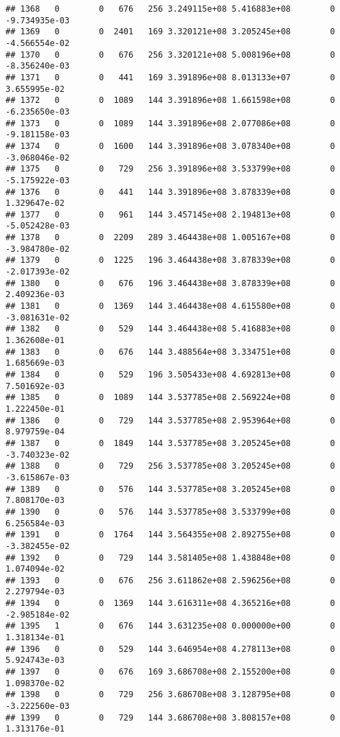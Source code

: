 \documentclass[
]{article}
\begin{document}
\begin{enumerate}
\begin{verbatim}
## 1368   0        0   676   256 3.249115e+08 5.416883e+08        0 -9.734935e-03
## 1369   0        0  2401   169 3.320121e+08 3.205245e+08        0 -4.566554e-02
## 1370   0        0   676   256 3.320121e+08 5.008196e+08        0 -8.356240e-03
## 1371   0        0   441   169 3.391896e+08 8.013133e+07        0  3.655995e-02
## 1372   0        0  1089   144 3.391896e+08 1.661598e+08        0 -6.235650e-03
## 1373   0        0  1089   144 3.391896e+08 2.077086e+08        0 -9.181158e-03
## 1374   0        0  1600   144 3.391896e+08 3.078340e+08        0 -3.068046e-02
## 1375   0        0   729   256 3.391896e+08 3.533799e+08        0 -5.175922e-03
## 1376   0        0   441   144 3.391896e+08 3.878339e+08        0  1.329647e-02
## 1377   0        0   961   144 3.457145e+08 2.194813e+08        0 -5.052428e-03
## 1378   0        0  2209   289 3.464438e+08 1.005167e+08        0 -3.984780e-02
## 1379   0        0  1225   196 3.464438e+08 3.878339e+08        0 -2.017393e-02
## 1380   0        0   676   196 3.464438e+08 3.878339e+08        0  2.409236e-03
## 1381   0        0  1369   144 3.464438e+08 4.615580e+08        0 -3.081631e-02
## 1382   0        0   529   144 3.464438e+08 5.416883e+08        0  1.362608e-01
## 1383   0        0   676   144 3.488564e+08 3.334751e+08        0  1.685669e-03
## 1384   0        0   529   196 3.505433e+08 4.692813e+08        0  7.501692e-03
## 1385   0        0  1089   144 3.537785e+08 2.569224e+08        0  1.222450e-01
## 1386   0        0   729   144 3.537785e+08 2.953964e+08        0  8.979759e-04
## 1387   0        0  1849   144 3.537785e+08 3.205245e+08        0 -3.740323e-02
## 1388   0        0   729   256 3.537785e+08 3.205245e+08        0 -3.615867e-03
## 1389   0        0   576   144 3.537785e+08 3.205245e+08        0  7.808170e-03
## 1390   0        0   576   144 3.537785e+08 3.533799e+08        0  6.256584e-03
## 1391   0        0  1764   144 3.564355e+08 2.892755e+08        0 -3.382455e-02
## 1392   0        0   729   144 3.581405e+08 1.438848e+08        0  1.074094e-02
## 1393   0        0   676   256 3.611862e+08 2.596256e+08        0  2.279794e-03
## 1394   0        0  1369   144 3.616311e+08 4.365216e+08        0 -2.985184e-02
## 1395   1        0   676   144 3.631235e+08 0.000000e+00        0  1.318134e-01
## 1396   0        0   529   144 3.646954e+08 4.278113e+08        0  5.924743e-03
## 1397   0        0   676   169 3.686708e+08 2.155200e+08        0  1.098370e-02
## 1398   0        0   729   256 3.686708e+08 3.128795e+08        0 -3.222560e-03
## 1399   0        0   729   144 3.686708e+08 3.808157e+08        0  1.313176e-01

\end{verbatim}
\end{enumerate}
\end{document}
